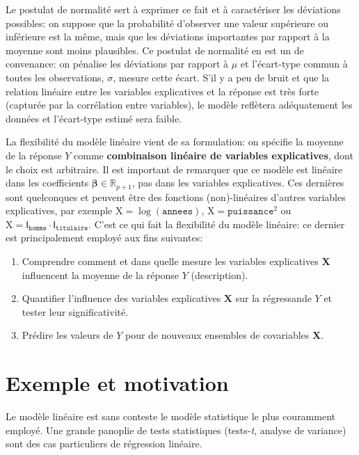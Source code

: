 \documentclass[
  11pt,
  letterpaper,
]{scrbook}
\providecommand{\tightlist}{%
  \setlength{\itemsep}{0pt}\setlength{\parskip}{0pt}}\usepackage{longtable,booktabs,array}
\theoremstyle{definition}
\theoremstyle{remark}
\begin{document}
Le postulat de normalité sert à exprimer ce fait et à caractériser les
déviations possibles: on suppose que la probabilité d'observer une
valeur supérieure ou inférieure est la même, mais que les déviations
importantes par rapport à la moyenne sont moins plausibles. Ce postulat
de normalité en est un de convenance: on pénalise les déviations par
rapport à \(\mu\) et l'écart-type commun à toutes les observations,
\(\sigma\), mesure cette écart. S'il y a peu de bruit et que la relation
linéaire entre les variables explicatives et la réponse est très forte
(capturée par la corrélation entre variables), le modèle reflètera
adéquatement les données et l'écart-type estimé sera faible.

La flexibilité du modèle linéaire vient de sa formulation: on spécifie
la moyenne de la réponse \(Y\) comme \textbf{combinaison linéaire de
variables explicatives}, dont le choix est arbitraire. Il est important
de remarquer que ce modèle est linéaire dans les coefficients
\(\boldsymbol{\beta}\in \mathbb{R}_{p+1}\), pas dans les variables
explicatives. Ces dernières sont quelconques et peuvent être des
fonctions (non)-linéaires d'autres variables explicatives, par exemple
\(\mathrm{X}=\log(\texttt{annees})\),
\(\mathrm{X}=\texttt{puissance}^2\) ou
\(\mathrm{X}= \mathsf{I}_{\texttt{homme}}\cdot\mathsf{I}_{\texttt{titulaire}}\).
C'est ce qui fait la flexibilité du modèle linéaire: ce dernier est
principalement employé aux fins suivantes:

\begin{enumerate}
\def\labelenumi{\arabic{enumi}.}
\tightlist
\item
  Comprendre comment et dans quelle mesure les variables explicatives
  \(\mathbf{X}\) influencent la moyenne de la réponse \(Y\)
  (description).
\item
  Quantifier l'influence des variables explicatives \(\mathbf{X}\) sur
  la régressande \(Y\) et tester leur significativité.
\item
  Prédire les valeurs de \(Y\) pour de nouveaux ensembles de covariables
  \(\mathbf{X}\).
\end{enumerate}

\section{Exemple et motivation}\label{exemple-et-motivation}

Le modèle linéaire est sans conteste le modèle statistique le plus
couramment employé. Une grande panoplie de tests statistiques
(tests-\emph{t}, analyse de variance) sont des cas particuliers de
régression linéaire.
\end{document}
